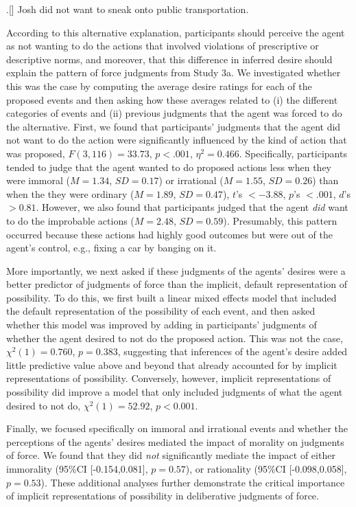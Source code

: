 \documentclass[11pt,letterpaper]{article}
\begin{document}
\ex.[] \label{desire} Josh did not want to sneak onto public transportation.

According to this alternative explanation, participants should perceive the agent as not wanting to do the actions that involved violations of prescriptive or descriptive norms, and moreover, that this difference in inferred desire should explain the pattern of force judgments from Study 3a. We investigated whether this was the case by computing the average desire ratings for each of the proposed events and then asking how these averages related to (i) the different categories of events and (ii) previous judgments that the agent was forced to do the alternative. First, we found that participants' judgments that the agent did not want to do the action were significantly influenced by the kind of action that was proposed, $F(3,116) = 33.73$, $p < .001$, $\eta^2 = 0.466$. Specifically, participants tended to judge that the agent wanted to do proposed actions less when they were immoral ($M = 1.34$, $SD = 0.17$) or irrational ($M = 1.55$, $SD = 0.26$) than when the they were ordinary ($M = 1.89$, $SD = 0.47$), $t$'s $< -3.88$, $p$'s $< .001$, $d$'s $>0.81$. However, we also found that participants judged that the agent \textit{did} want to do the improbable actions ($M = 2.48$, $SD = 0.59$). Presumably, this pattern occurred because these actions had highly good outcomes but were out of the agent's control, e.g., fixing a car by banging on it. 

More importantly, we next asked if these judgments of the agents' desires were a better predictor of judgments of force than the implicit, default representation of possibility. To do this, we first built a linear mixed effects model that included the default representation of the possibility of each event, and then asked whether this model was improved by adding in participants' judgments of whether the agent desired to not do the proposed action. This was not the case, $\chi^2(1) = 0.760$, $p = 0.383$, suggesting that inferences of the agent's desire added little predictive value above and beyond that already accounted for by implicit representations of possibility. Conversely, however, implicit representations of possibility did improve a model that only included judgments of what the agent desired to not do,  $\chi^2(1) = 52.92$, $p < 0.001$. 

Finally, we focused specifically on immoral and irrational events and whether the perceptions of the agents' desires mediated the impact of morality on judgments of force. We found that they did \textit{not} significantly mediate the impact of either immorality (95\%CI [-0.154,0.081], $p = 0.57$), or rationality (95\%CI [-0.098,0.058], $p = 0.53$). These additional analyses further demonstrate the critical importance of implicit representations of possibility in deliberative judgments of force.
\end{document}
